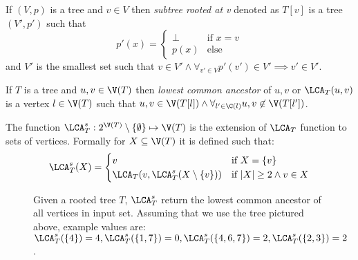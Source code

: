\begin{defi}
    If $(V,p)$ is a tree and $v \in V$ then \emph{subtree rooted at v} denoted as $T[v]$ is a tree $(V', p')$ such that
    \[
        p'(x) = \begin{cases}
            \bot & \text{if } x = v \\
            p(x) & \text{else}
        \end{cases}
    \]
    and $V'$ is the smallest set such that $v \in V' \land \forall_{v' \in V} p'(v') \in V' \implies v' \in V'$.
\end{defi}

\begin{defi}
    If $T$ is a tree and $u,v \in \V(T)$ then \emph{lowest common ancestor} of $u, v$ or $\LCA_T(u,v)$ is a vertex $l \in \V(T)$ such that $u,v \in \V(T[l]) \land \forall_{l' \in \C(l)} u,v \not\in \V(T[l'])$.
\end{defi}

\begin{defi}
    The function $\LCA_T^s : 2^{\V(T)} \setminus \{ \emptyset \} \mapsto \V(T)$ is the extension of $\LCA_T$ function to sets of vertices. Formally for $X \subseteq \V(T)$ it is defined such that:
    \[
        \LCA_T^s(X) = \begin{cases}
            v                                      & \text{if } X = \{v\}                \\
            \LCA_T(v, \LCA_T^s(X \setminus \{v\})) & \text{if } |X| \geq 2 \land v \in X \\
        \end{cases}
    \]
\end{defi}

\begin{figure}[h]
    \centering
    \caption{Given a rooted tree $T$, $\LCA_T^s$ return the lowest common ancestor of all vertices in input set. Assuming that we use the tree pictured above, example values are: $\LCA_T^s(\{4\}) = 4, \LCA_T^s(\{1,7\}) = 0, \LCA_T^s(\{4, 6, 7\}) = 2, \LCA_T^s(\{2,3\}) = 2$.}
\end{figure}
